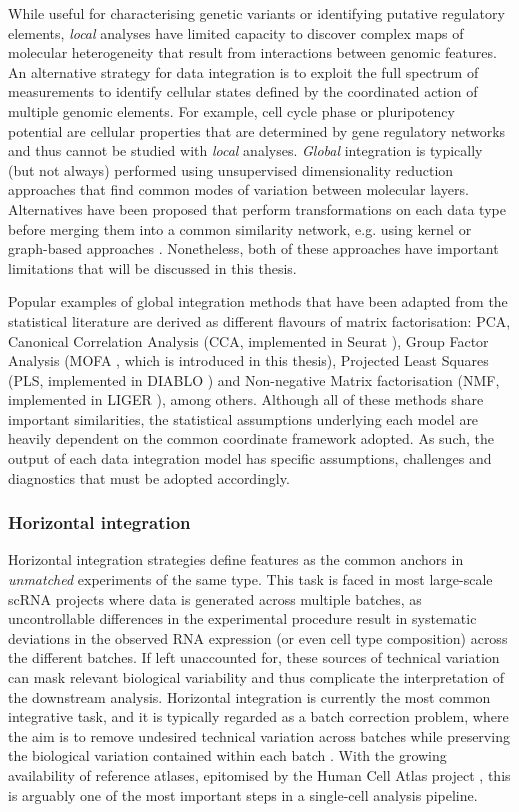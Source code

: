 While useful for characterising genetic variants or identifying putative regulatory elements, \textit{local} analyses have limited capacity to discover complex maps of molecular heterogeneity that result from interactions between genomic features. An alternative strategy for data integration is to exploit the full spectrum of measurements to identify cellular states defined by the coordinated action of multiple genomic elements. For example, cell cycle phase or pluripotency potential are cellular properties that are determined by gene regulatory networks and thus cannot be studied with \textit{local} analyses. \textit{Global} integration is typically (but not always) performed using unsupervised dimensionality reduction approaches that find common modes of variation between molecular layers. Alternatives have been proposed that perform transformations on each data type before merging them into a common similarity network, e.g. using kernel or graph-based approaches \cite{Lanckriet2004, Wang2014}. Nonetheless, both of these approaches have important limitations that will be discussed in this thesis.

Popular examples of global integration methods that have been adapted from the statistical literature are derived as different flavours of matrix factorisation: PCA, Canonical Correlation Analysis (CCA, implemented in Seurat \cite{Butler2018}), Group Factor Analysis (MOFA \cite{Argelaguet2018,Argelaguet2019}, which is introduced in this thesis), Projected Least Squares (PLS, implemented in DIABLO \cite{Singh2018}) and Non-negative Matrix factorisation (NMF, implemented in LIGER \cite{Welch2019}), among others. Although all of these methods share important similarities, the statistical assumptions underlying each model are heavily dependent on the common coordinate framework adopted. As such, the output of each data integration model has specific assumptions, challenges and diagnostics that must be adopted accordingly.

\subsubsection{Horizontal integration}

Horizontal integration strategies define features as the common anchors in \textit{unmatched} experiments of the same type. This task is faced in most large-scale scRNA projects where data is generated across multiple batches, as uncontrollable differences in the experimental procedure result in systematic deviations in the observed RNA expression (or even cell type composition) across the different batches. If left unaccounted for, these sources of technical variation can mask relevant biological variability and thus complicate the interpretation of the downstream analysis. Horizontal integration is currently the most common integrative task, and it is typically regarded as a batch correction problem, where the aim is to remove undesired technical variation across batches while preserving the biological variation contained within each batch \cite{Tran2020}. With the growing availability of reference atlases, epitomised by the Human Cell Atlas project \cite{Aviv2017}, this is arguably one of the most important steps in a single-cell analysis pipeline. 

